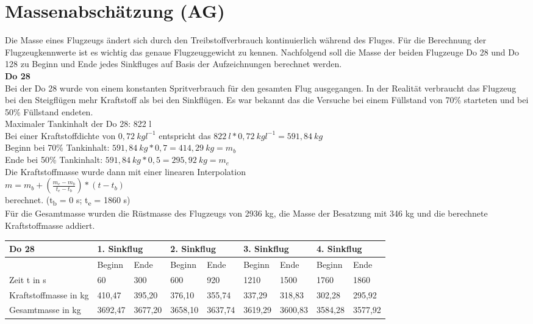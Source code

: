 \chapter{Massenabschätzung (AG)}
\label{c:Mabsch}
Die Masse eines Flugzeugs ändert sich durch den Treibstoffverbrauch kontinuierlich während des Fluges. Für die Berechnung der Flugzeugkennwerte ist es wichtig das genaue Flugzeuggewicht zu kennen. Nachfolgend soll die Masse der beiden Flugzeuge Do 28 und Do 128 zu Beginn und Ende jedes Sinkfluges auf Basis der Aufzeichnungen berechnet werden. \\
\textbf{Do 28}\\
Bei der Do 28 wurde von einem konstanten Spritverbrauch für den gesamten Flug ausgegangen. In der Realität verbraucht das Flugzeug bei den Steigflügen mehr Kraftstoff als bei den Sinkflügen. Es war bekannt das die Versuche bei einem Füllstand von 70\% starteten und bei 50\% Füllstand endeten.\\
Maximaler Tankinhalt der Do 28: 822 l\\
Bei einer Kraftstoffdichte von $0,72\ kgl^{-1}$ entspricht das $822\ l * 0,72\ kgl^{-1} = 591,84\ kg$\\
Beginn bei 70\% Tankinhalt: $591,84\ kg * 0,7 = 414,29\ kg = m_b$\\
Ende bei 50\% Tankinhalt: $591,84\ kg * 0,5 = 295,92\ kg = m_e$\\
Die Kraftstoffmasse wurde dann mit einer linearen Interpolation \\
$m=m_b+(\frac{m_e-m_b}{t_e-t_b})*(t-t_b)$\\
berechnet. (t\textsubscript{b} = 0 s; t\textsubscript{e} = 1860 s)\\
Für die Gesamtmasse wurden die Rüstmasse des Flugzeugs von 2936 kg, die Masse der Besatzung mit 346 kg und die berechnete Kraftstoffmasse addiert. 

\begin{table}[h]
\begin{tabular}{|l|l|l|l|l|l|l|l|l|}
\hline
Do 28                 & \multicolumn{2}{l|}{1. Sinkflug} & \multicolumn{2}{l|}{2. Sinkflug} & \multicolumn{2}{l|}{3. Sinkflug} & \multicolumn{2}{l|}{4. Sinkflug} \\ \hline
                      & Beginn          & Ende           & Beginn          & Ende           & Beginn          & Ende           & Beginn          & Ende           \\ \hline
Zeit t in s           & 60              & 300            & 600             & 920            & 1210            & 1500           & 1760            & 1860           \\ \hline
Kraftstoffmasse in kg & 410,47          & 395,20         & 376,10          & 355,74         & 337,29          & 318,83         & 302,28          & 295,92         \\ \hline
Gesamtmasse in kg     & 3692,47         & 3677,20        & 3658,10         & 3637,74        & 3619,29         & 3600,83        & 3584,28         & 3577,92        \\ \hline
\end{tabular}
\end{table}

